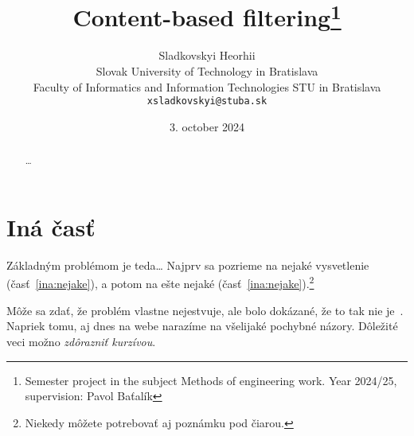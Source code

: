 \documentclass[10pt,twoside,slovak,a4paper]{article}
\title{Content-based filtering\thanks{Semester project in the subject Methods of engineering work. Year 2024/25, supervision: Pavol Baťalík}}
\author{Sladkovskyi Heorhii\\[2pt]
	{\small Slovak University of Technology in Bratislava}\\
	{\small Faculty of Informatics and Information Technologies STU in Bratislava}\\
	{\small \texttt{xsladkovskyi@stuba.sk}}
	}
\date{\small 3. october 2024}
\begin{document}
\maketitle

\begin{abstract}
\ldots
\end{abstract}

\section{Iná časť} \label{ina}

Základným problémom je teda\ldots{} Najprv sa pozrieme na nejaké vysvetlenie (časť~\ref{ina:nejake}), a potom na ešte nejaké (časť~\ref{ina:nejake}).\footnote{Niekedy môžete potrebovať aj poznámku pod čiarou.}

Môže sa zdať, že problém vlastne nejestvuje\cite{Coplien:MPD}, ale bolo dokázané, že to tak nie je~\cite{Czarnecki:Staged, Czarnecki:Progress}. Napriek tomu, aj dnes na webe narazíme na všelijaké pochybné názory\cite{PLP-Framework}. Dôležité veci možno \emph{zdôrazniť kurzívou}.



\end{document}

